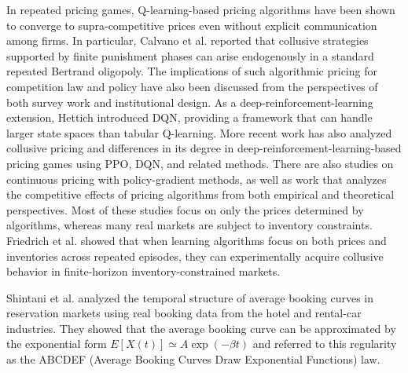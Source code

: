 \documentclass[runningheads]{llncs}
\begin{document}
In repeated pricing games, Q-learning-based pricing algorithms have been shown to converge to supra-competitive prices even without explicit communication among firms\cite{calvano2020a,klein2021}.
In particular, Calvano et al.\cite{calvano2020a} reported that collusive strategies supported by finite punishment phases can arise endogenously in a standard repeated Bertrand oligopoly.
The implications of such algorithmic pricing for competition law and policy have also been discussed from the perspectives of both survey work and institutional design\cite{calvano2020b,harrington2019}.
As a deep-reinforcement-learning extension, Hettich\cite{hettich2021} introduced DQN\cite{mnih2015}, providing a framework that can handle larger state spaces than tabular Q-learning.
More recent work has also analyzed collusive pricing and differences in its degree in deep-reinforcement-learning-based pricing games using PPO\cite{schulman2017proximal}, DQN, and related methods\cite{Schlechtinger2024,deng2024algorithmic}.
There are also studies on continuous pricing with policy-gradient methods\cite{martello2022autonomous}, as well as work that analyzes the competitive effects of pricing algorithms from both empirical and theoretical perspectives\cite{brown2021,assad2020,Abada2020,Sanchez-Cartas2022}.
Most of these studies focus on only the prices determined by algorithms, whereas many real markets are subject to inventory constraints.
Friedrich et al.\cite{friedrich2025learning} showed that when learning algorithms focus on both prices and inventories across repeated episodes, they can experimentally acquire collusive behavior in finite-horizon inventory-constrained markets.

Shintani et al.\cite{ShintaniUmeno2023ABCDEF} analyzed the temporal structure of average booking curves in reservation markets using real booking data from the hotel and rental-car industries.
They showed that the average booking curve can be approximated by the exponential form $E[X(t)] \simeq A\exp(-\beta t)$ and referred to this regularity as the ABCDEF (Average Booking Curves Draw Exponential Functions) law.
\end{document}
